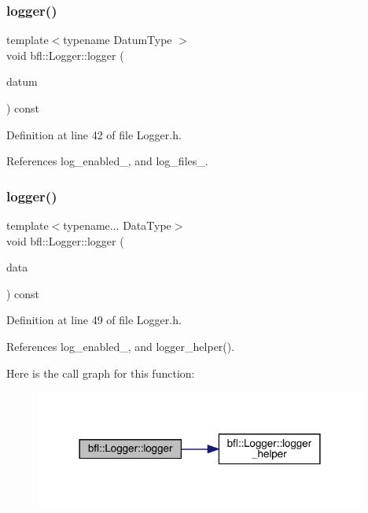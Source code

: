 \subsubsection{\texorpdfstring{logger()}{logger()}\hspace{0.1cm}{\footnotesize\ttfamily [3/4]}}
{\footnotesize\ttfamily template$<$typename Datum\+Type $>$ \\
void bfl\+::\+Logger\+::logger (\begin{DoxyParamCaption}\item[{Datum\+Type}]{datum }\end{DoxyParamCaption}) const\hspace{0.3cm}{\ttfamily [inline]}}



Definition at line 42 of file Logger.\+h.



References log\+\_\+enabled\+\_\+, and log\+\_\+files\+\_\+.

\mbox{\label{classbfl_1_1Logger_a0f0cf7ce956546d94dfb1feb7cebf171}} 
\subsubsection{\texorpdfstring{logger()}{logger()}\hspace{0.1cm}{\footnotesize\ttfamily [4/4]}}
{\footnotesize\ttfamily template$<$typename... Data\+Type$>$ \\
void bfl\+::\+Logger\+::logger (\begin{DoxyParamCaption}\item[{Data\+Type...}]{data }\end{DoxyParamCaption}) const\hspace{0.3cm}{\ttfamily [inline]}}



Definition at line 49 of file Logger.\+h.



References log\+\_\+enabled\+\_\+, and logger\+\_\+helper().

Here is the call graph for this function\+:
\nopagebreak
\begin{figure}[H]
\begin{center}
\leavevmode
\includegraphics[width=309pt]{classbfl_1_1Logger_a0f0cf7ce956546d94dfb1feb7cebf171_cgraph}
\end{center}
\end{figure}
\mbox{\label{classbfl_1_1Logger_a0904d00289e404f5bae335db56ceacae}} 

